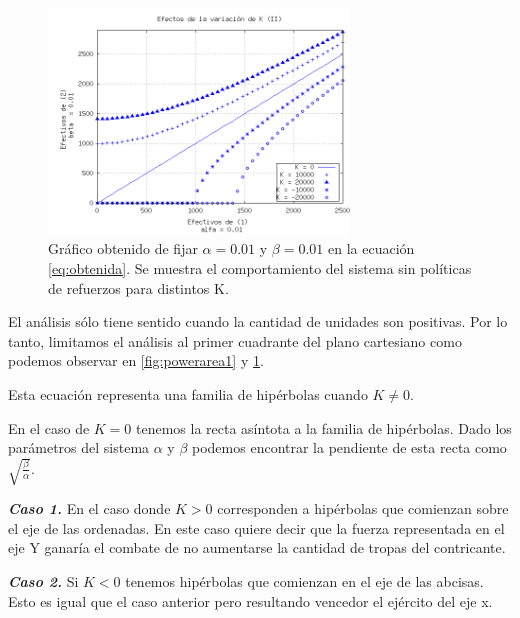 \documentclass{sig-alternate}
\begin{document}
\begin{figure}[h]
\begin{center}
\includegraphics[width=8cm]{power_areas_2}
\caption{\label{fig:powerarea2} Gr\'afico obtenido de fijar $\alpha = 0.01$ y $\beta = 0.01$ en la ecuación \ref{eq:obtenida}. Se muestra el comportamiento del sistema sin políticas de refuerzos para distintos K.}
\end{center}
\end{figure}

El an\'alisis s\'olo tiene sentido cuando la cantidad de unidades son positivas.
Por lo tanto, limitamos el an\'alisis al primer cuadrante del plano cartesiano como podemos observar en \ref{fig:powerarea1} y \ref{fig:powerarea2}.

Esta ecuación representa una familia de hip\'erbolas cuando $K \ne 0$.

En el caso de $K = 0$ tenemos la recta asíntota a la familia de
hipérbolas. Dado los parámetros del sistema $\alpha$ y $\beta$ podemos
encontrar la pendiente de esta recta como
$\sqrt{\frac{\beta}{\alpha}}$. 

\textbf{\textit{Caso 1.}} En el caso donde $K > 0$ corresponden a hip\'erbolas que comienzan
sobre el eje de las ordenadas. En este caso quiere decir que la fuerza representada
en el eje Y ganar\'ia el combate de no aumentarse la cantidad de tropas del contricante.


\textbf{\textit{Caso 2.}} Si $K<0$ tenemos hip\'erbolas que comienzan
en el eje de las abcisas. Esto es igual que el caso anterior pero resultando vencedor el ejército del eje x.
\end{document}
